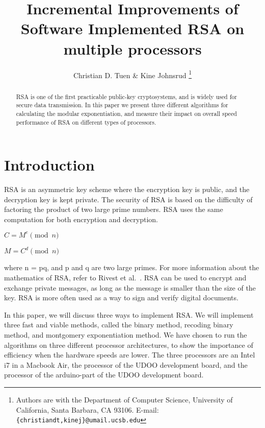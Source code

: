 \documentclass[twocolumn]{IEEEtran}
\begin{document}
\title{Incremental Improvements of Software Implemented RSA on multiple processors}


\author{Christian D. Tuen \& Kine Johnsrud
\thanks{Authors are with the
Department of Computer Science,
University of California, Santa Barbara, CA 93106.
E-mail: \texttt{\{christiandt,kinej\}@umail.ucsb.edu}}
}


\maketitle

\begin{abstract}
RSA is one of the first practicable public-key cryptosystems, and is widely used for secure data transmission. In this paper we present three different algorithms for calculating the modular exponentiation, and measure their impact on overall speed performance of RSA on different types of processors.
\end{abstract}

\section{Introduction}
RSA is an asymmetric key scheme where the encryption key is public, and the decryption key is kept private. The security of RSA is based on the difficulty of factoring the product of two large prime numbers. RSA uses the same computation for both encryption and decryption.

\bigskip

\centerline{$C = M^e \pmod{n}$}
\centerline{$M = C^d \pmod{n}$}

\bigskip

where n = pq, and p and q are two large primes. For more information about the mathematics of RSA, refer to Rivest et al.~\cite{rsa}. RSA can be used to encrypt and exchange private messages, as long as the message is smaller than the size of the key. RSA is more often used as a way to sign and verify digital documents. 

In this paper, we will discuss three ways to implement RSA. We will implement three fast and viable methods, called the binary method, recoding binary method, and montgomery exponentiation method. We have chosen to run the algorithms on three different processor architectures, to show the importance of efficiency when the hardware speeds are lower. The three processors are an Intel i7 in a Macbook Air, the processor of the UDOO development board, and the processor of the arduino-part of the UDOO development board.
\end{document}
